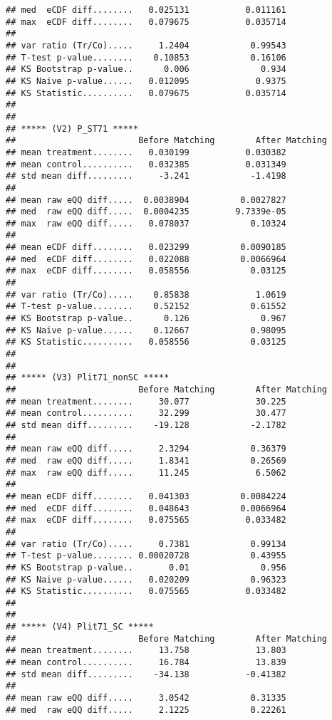 \documentclass[
]{article}
\begin{document}
\begin{verbatim}
## med  eCDF diff........   0.025131           0.011161 
## max  eCDF diff........   0.079675           0.035714 
## 
## var ratio (Tr/Co).....     1.2404            0.99543 
## T-test p-value........    0.10853            0.16106 
## KS Bootstrap p-value..      0.006              0.934 
## KS Naive p-value......   0.012095             0.9375 
## KS Statistic..........   0.079675           0.035714 
## 
## 
## ***** (V2) P_ST71 *****
##                        Before Matching        After Matching
## mean treatment........   0.030199           0.030382 
## mean control..........   0.032385           0.031349 
## std mean diff.........     -3.241            -1.4198 
## 
## mean raw eQQ diff.....  0.0038904          0.0027827 
## med  raw eQQ diff.....  0.0004235         9.7339e-05 
## max  raw eQQ diff.....   0.078037            0.10324 
## 
## mean eCDF diff........   0.023299          0.0090185 
## med  eCDF diff........   0.022088          0.0066964 
## max  eCDF diff........   0.058556            0.03125 
## 
## var ratio (Tr/Co).....    0.85838             1.0619 
## T-test p-value........    0.52152            0.61552 
## KS Bootstrap p-value..      0.126              0.967 
## KS Naive p-value......    0.12667            0.98095 
## KS Statistic..........   0.058556            0.03125 
## 
## 
## ***** (V3) Plit71_nonSC *****
##                        Before Matching        After Matching
## mean treatment........     30.077             30.225 
## mean control..........     32.299             30.477 
## std mean diff.........    -19.128            -2.1782 
## 
## mean raw eQQ diff.....     2.3294            0.36379 
## med  raw eQQ diff.....     1.8341            0.26569 
## max  raw eQQ diff.....     11.245             6.5062 
## 
## mean eCDF diff........   0.041303          0.0084224 
## med  eCDF diff........   0.048643          0.0066964 
## max  eCDF diff........   0.075565           0.033482 
## 
## var ratio (Tr/Co).....     0.7381            0.99134 
## T-test p-value........ 0.00020728            0.43955 
## KS Bootstrap p-value..       0.01              0.956 
## KS Naive p-value......   0.020209            0.96323 
## KS Statistic..........   0.075565           0.033482 
## 
## 
## ***** (V4) Plit71_SC *****
##                        Before Matching        After Matching
## mean treatment........     13.758             13.803 
## mean control..........     16.784             13.839 
## std mean diff.........    -34.138           -0.41382 
## 
## mean raw eQQ diff.....     3.0542            0.31335 
## med  raw eQQ diff.....     2.1225            0.22261 

\end{verbatim}
\end{document}

